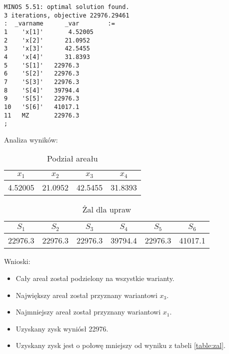 \documentclass{article}
\begin{document}
\lstset{language=AMPL}
\begin{lstlisting}[caption={Wynik modlu z solwerem MINOS.},label=DescriptiveLabel]
MINOS 5.51: optimal solution found.
3 iterations, objective 22976.29461
:  _varname      _var        :=
1    'x[1]'       4.52005
2    'x[2]'      21.0952
3    'x[3]'      42.5455
4    'x[4]'      31.8393
5    'S[1]'   22976.3
6    'S[2]'   22976.3
7    'S[3]'   22976.3
8    'S[4]'   39794.4
9    'S[5]'   22976.3
10   'S[6]'   41017.1
11   MZ       22976.3
;
\end{lstlisting}

\noindent
Analiza wyników:

\begin{table}[H]
  \begin{center}
    \begin{tabular}{|c|c|c|c|}
      \hline
      $x_1$ & $x_2$ & $x_3$ & $x_4$ \\
      \hline
       4.52005 & 21.0952 & 42.5455 & 31.8393 \\
      \hline
    \end{tabular} 
    \caption{\label{table:podzialarealu3} Podział areału}
  \end{center}
\end{table}

\begin{table}[H]
  \begin{center}
    \begin{tabular}{|c|c|c|c|c|c|}
      \hline
      $S_1$ & $S_2$ & $S_3$ & $S_4$ & $S_5$ & $S_6$ \\
      \hline
      22976.3 & 22976.3 & 22976.3 & 39794.4 & 22976.3 & 41017.1 \\
      \hline
    \end{tabular} 
    \caption{\label{table:zyskdlaupraw3} Żal dla upraw}
  \end{center}
\end{table}

\noindent
Wnioski:

\begin{itemize}
    \item Cały areał został podzielony na wszystkie warianty.
    \item Największy areał został przyznany wariantowi $x_3$.
    \item Najmniejszy areał został przyznany wariantowi $x_1$.
    \item Uzyskany zysk wyniósł 22976.
    \item Uzyskany zysk jest o połowę mniejszy od wyniku z tabeli \ref{table:zal}.
\end{itemize}
\end{document}
